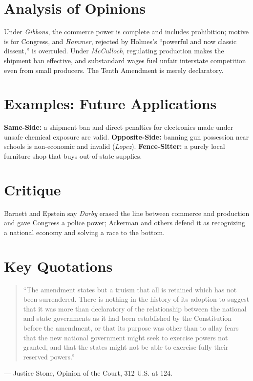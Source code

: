 \documentclass[12pt]{article}
\begin{document}
\section{Analysis of Opinions}
Under \textit{Gibbons}, the commerce power is complete and includes prohibition; motive is for Congress, and \textit{Hammer}, rejected by Holmes's ``powerful and now classic dissent,'' is overruled. Under \textit{McCulloch}, regulating production makes the shipment ban effective, and substandard wages fuel unfair interstate competition even from small producers. The Tenth Amendment is merely declaratory.

\section{Examples: Future Applications}
\textbf{Same-Side:} a shipment ban and direct penalties for electronics made under unsafe chemical exposure are valid. \textbf{Opposite-Side:} banning gun possession near schools is non-economic and invalid (\textit{Lopez}). \textbf{Fence-Sitter:} a purely local furniture shop that buys out-of-state supplies.

\section{Critique}
Barnett and Epstein say \textit{Darby} erased the line between commerce and production and gave Congress a police power; Ackerman and others defend it as recognizing a national economy and solving a race to the bottom.

\section{Key Quotations}
\begin{quote}
``The amendment states but a truism that all is retained which has not been surrendered. There is nothing in the history of its adoption to suggest that it was more than declaratory of the relationship between the national and state governments as it had been established by the Constitution before the amendment, or that its purpose was other than to allay fears that the new national government might seek to exercise powers not granted, and that the states might not be able to exercise fully their reserved powers.''
\end{quote}
\noindent --- Justice Stone, Opinion of the Court, 312 U.S. at 124.
\end{document}
